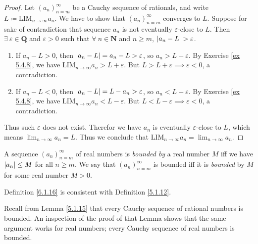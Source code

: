 \begin{proof}
    Let \((a_n)_{n = m}^\infty\) be a Cauchy sequence of rationals, and write \(L \coloneqq \text{LIM}_{n \to \infty} a_n\).
    We have to show that \((a_n)_{n = m}^\infty\) converges to \(L\).
    Suppose for sake of contradiction that sequence \(a_n\) is not eventually \(\varepsilon\)-close to \(L\).
    Then \(\exists\ \varepsilon \in \mathbf{Q}\) and \(\varepsilon > 0\) such that \(\forall\ n \in \mathbf{N}\) and \(n \geq m\), \(\abs*{a_n - L} > \varepsilon\).
    \begin{enumerate}
        \item If \(a_n - L > 0\), then \(\abs*{a_n - L} = a_n - L > \varepsilon\), so \(a_n > L + \varepsilon\).
              By Exercise \ref{ex 5.4.8}, we have \(\text{LIM}_{n \to \infty} a_n > L + \varepsilon\).
              But \(L > L + \varepsilon \implies \varepsilon < 0\), a contradiction.
        \item If \(a_n - L < 0\), then \(\abs*{a_n - L} = L - a_n > \varepsilon\), so \(a_n < L - \varepsilon\).
              By Exercise \ref{ex 5.4.8}, we have \(\text{LIM}_{n \to \infty} a_n < L - \varepsilon\).
              But \(L < L - \varepsilon \implies \varepsilon < 0\), a contradiction.
    \end{enumerate}
    Thus such \(\varepsilon\) does not exist.
    Therefor we have \(a_n\) is eventually \(\varepsilon\)-close to \(L\), which means \(\lim_{n \to \infty} a_n = L\).
    Thus we conclude that \(\text{LIM}_{n \to \infty} a_n = \lim_{n \to \infty} a_n\).
\end{proof}

\begin{definition}\label{6.1.16}
    A sequence \((a_n)_{n = m}^\infty\) of real numbers is \emph{bounded by} a real number \(M\) iff we have \(\abs*{a_n} \leq M\) for all \(n \geq m\).
    We say that \((a_n)_{n = m}^\infty\) is bounded iff it is \emph{bounded} by \(M\) for some real number \(M > 0\).
\end{definition}

\begin{note}
    Definition \ref{6.1.16} is consistent with Definition \ref{5.1.12}.
\end{note}

\begin{note}
    Recall from Lemma \ref{5.1.15} that every Cauchy sequence of rational numbers is bounded.
    An inspection of the proof of that Lemma shows that the same argument works for real numbers;
    every Cauchy sequence of real numbers is bounded.
\end{note}

